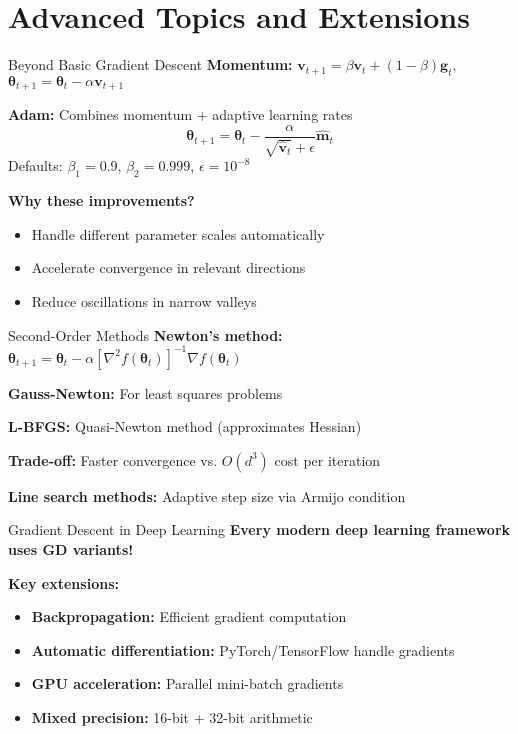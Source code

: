 \documentclass[aspectratio=169,11pt]{beamer}
\newcommand{\grad}{\nabla}
\newcommand{\hess}{\nabla^2}
\newcommand{\vtheta}{\bm{\theta}}
\newcommand{\vg}{\bm{g}}
\newcommand{\vv}{\bm{v}}
\begin{document}
\section{Advanced Topics and Extensions}

\begin{frame}{Beyond Basic Gradient Descent}
\textbf{Momentum:} $\vv_{t+1} = \beta \vv_t + (1-\beta)\vg_t$, $\vtheta_{t+1} = \vtheta_t - \alpha \vv_{t+1}$

\textbf{Adam:} Combines momentum + adaptive learning rates
\[\vtheta_{t+1} = \vtheta_t - \frac{\alpha}{\sqrt{\hat{\vv}_t} + \epsilon} \hat{\mathbf{m}}_t\]
Defaults: $\beta_1=0.9$, $\beta_2=0.999$, $\epsilon=10^{-8}$

\pause
\textbf{Why these improvements?}
\begin{itemize}
\item Handle different parameter scales automatically
\item Accelerate convergence in relevant directions
\item Reduce oscillations in narrow valleys
\end{itemize}
\end{frame}

\begin{frame}{Second-Order Methods}
\textbf{Newton's method:} $\vtheta_{t+1} = \vtheta_t - \alpha [\hess f(\vtheta_t)]^{-1} \grad f(\vtheta_t)$

\textbf{Gauss-Newton:} For least squares problems

\textbf{L-BFGS:} Quasi-Newton method (approximates Hessian)

\pause
\textbf{Trade-off:} Faster convergence vs. $O(d^3)$ cost per iteration

\pause
\textbf{Line search methods:} Adaptive step size via Armijo condition
\end{frame}

\begin{frame}{Gradient Descent in Deep Learning}
\textbf{Every modern deep learning framework uses GD variants!}

\textbf{Key extensions:}
\begin{itemize}
\item \textbf{Backpropagation:} Efficient gradient computation
\item \textbf{Automatic differentiation:} PyTorch/TensorFlow handle gradients
\item \textbf{GPU acceleration:} Parallel mini-batch gradients
\item \textbf{Mixed precision:} 16-bit + 32-bit arithmetic
\end{itemize}
\end{frame}
\end{document}
